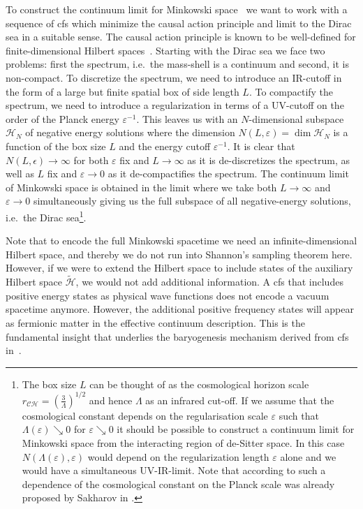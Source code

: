 \documentclass[reqno,11pt]{amsart}
\renewcommand{\H}{\mathcal{H}}
\numberwithin{equation}{section}
\begin{document}
To construct the continuum limit for Minkowski space~\cite[Remark 1.2.1 and Section 2.4]{cfs} we want to work with a sequence of \ac{cfs} which minimize
the causal action principle and limit to the Dirac sea in a suitable sense.
The causal action principle is known to be well-defined for finite-dimensional Hilbert spaces~\cite[Chapter 12]{Bernard2014, Finster2024}.
Starting with the Dirac sea we face two problems: first the spectrum, i.e.~the mass-shell is a continuum and second, it is non-compact.
To discretize the spectrum, we need to introduce an IR-cutoff in the form of a large but finite spatial box of side length $L$.
To compactify the spectrum, we need to introduce a regularization in terms of a UV-cutoff on the order of the Planck energy $\varepsilon^{-1}$.
This leaves us with an $N$-dimensional subspace $\H_N$ of negative energy solutions where the dimension $N(L,\varepsilon)= \dim \H_N$
is a function of the box size $L$ and the energy cutoff $\varepsilon^{-1}$.
It is clear that $N(L,\epsilon)\rightarrow \infty$ for both $\varepsilon$ fix and $L\rightarrow \infty$ as it is de-discretizes the spectrum, as well as $L$ fix and $\varepsilon \rightarrow 0$
as it de-compactifies the spectrum.
The continuum limit of Minkowski space is obtained in the limit where we take both $L\rightarrow \infty$ and $\varepsilon \rightarrow 0$ simultaneously giving us the full subspace of all negative-energy
solutions, i.e.~the Dirac sea\footnote{
    The box size $L$ can be thought of as the cosmological horizon scale $r_{\mathcal{CH}}= \left( \frac{3}{\Lambda}\right)^{1/2}$
    and hence $\Lambda$ as an infrared cut-off.
    If we assume that the cosmological constant depends on the regularisation scale $\varepsilon$ such that $\Lambda(\varepsilon) \searrow 0$
    for $\varepsilon \searrow 0$ it should be possible to construct a continuum limit for Minkowski space from the interacting
    region of de-Sitter space.
    In this case $N(\Lambda(\varepsilon),\varepsilon)$  would depend on the regularization length $\varepsilon$ alone and
    we would have a simultaneous UV-IR-limit.
    Note that according to \cite{visser2002sakharov} such a dependence of the cosmological constant on the Planck scale was already proposed
    by Sakharov in \cite{sakharov2000vacuum}.
}.

Note that to encode the full Minkowski spacetime we need an infinite-dimensional Hilbert space, and thereby we do not run
into Shannon's sampling theorem here.
However, if we were to extend the Hilbert space to include states of the auxiliary Hilbert space $\tilde{\H}$, we would
not add additional information.
A \ac{cfs} that includes positive energy states as physical wave functions does not encode a vacuum spacetime anymore.
However, the additional positive frequency states will appear as fermionic matter in the effective continuum description.
This is the fundamental insight that underlies the baryogenesis mechanism derived from \ac{cfs} in~\cite{baryogenesis,finster2025baryogenesis}. 
\end{document}
